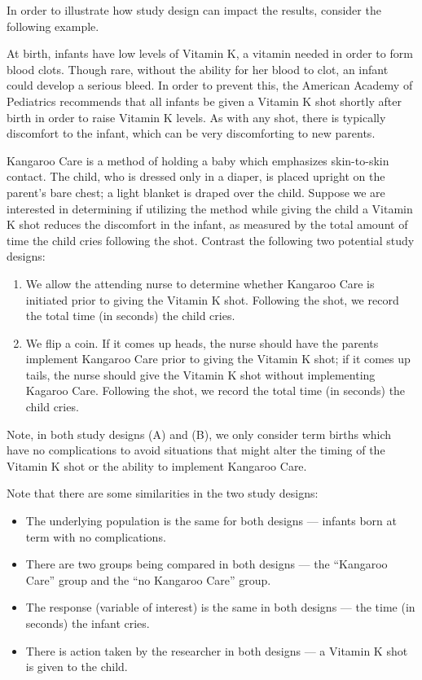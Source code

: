 \documentclass[]{book}
\providecommand{\tightlist}{%
  \setlength{\itemsep}{0pt}\setlength{\parskip}{0pt}}
\theoremstyle{plain}
\theoremstyle{mydefn}
\theoremstyle{myexmpl}
\theoremstyle{remark}
\let\BeginKnitrBlock\begin \let\EndKnitrBlock\end
\let\BeginKnitrBlock\begin \let\EndKnitrBlock\end
\begin{document}
In order to illustrate how study design can impact the results, consider
the following example.

\BeginKnitrBlock{example}[Kangaroo Care]
\protect\hypertarget{exm:data-kangaroo}{}{\label{exm:data-kangaroo}
{} }At birth, infants have low levels of
Vitamin K, a vitamin needed in order to form blood clots. Though rare,
without the ability for her blood to clot, an infant could develop a
serious bleed. In order to prevent this, the American Academy of
Pediatrics recommends that all infants be given a Vitamin K shot shortly
after birth in order to raise Vitamin K levels. As with any shot, there
is typically discomfort to the infant, which can be very discomforting
to new parents.

Kangaroo Care is a method of holding a baby which emphasizes
skin-to-skin contact. The child, who is dressed only in a diaper, is
placed upright on the parent's bare chest; a light blanket is draped
over the child. Suppose we are interested in determining if utilizing
the method while giving the child a Vitamin K shot reduces the
discomfort in the infant, as measured by the total amount of time the
child cries following the shot. Contrast the following two potential
study designs:

\begin{enumerate}
\def\labelenumi{(\Alph{enumi})}
\tightlist
\item
  We allow the attending nurse to determine whether Kangaroo Care is
  initiated prior to giving the Vitamin K shot. Following the shot, we
  record the total time (in seconds) the child cries.
\item
  We flip a coin. If it comes up heads, the nurse should have the
  parents implement Kangaroo Care prior to giving the Vitamin K shot; if
  it comes up tails, the nurse should give the Vitamin K shot without
  implementing Kagaroo Care. Following the shot, we record the total
  time (in seconds) the child cries.
\end{enumerate}

Note, in both study designs (A) and (B), we only consider term births
which have no complications to avoid situations that might alter the
timing of the Vitamin K shot or the ability to implement Kangaroo Care.
\EndKnitrBlock{example}

Note that there are some similarities in the two study designs:

\begin{itemize}
\tightlist
\item
  The underlying population is the same for both designs --- infants
  born at term with no complications.
\item
  There are two groups being compared in both designs --- the ``Kangaroo
  Care'' group and the ``no Kangaroo Care'' group.
\item
  The response (variable of interest) is the same in both designs ---
  the time (in seconds) the infant cries.
\item
  There is action taken by the researcher in both designs --- a Vitamin
  K shot is given to the child.
\end{itemize}
\end{document}
